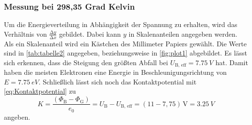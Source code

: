 \subsubsection*{Messung bei 298,35 Grad Kelvin}
Um die Energieverteilung in Abhängigkeit der Spannung zu erhalten, wird das Verhältnis von $\frac{\increment y}{\increment x}$ gebildet.
Dabei kann $y$ in Skalenanteilen angegeben werden.
Als ein Skalenanteil wird ein Kästchen des Millimeter Papiers gewählt.
Die Werte sind in \autoref{tab:tabelle2} angegeben, beziehungsweise in \autoref{fig:plot1} abgebildet.
Es lässt sich erkennen, dass die Steigung den größten Abfall bei $U_\text{B, eff} = \qty{7.75}{V}$ hat.
Damit haben die meisten Elektronen eine Energie in Beschleunigungsrichtung von $E = \qty{7.75}{eV}$.
Schließlich lässt sich noch das Kontaktpotential mit \autoref{eq:Kontaktpotential} zu
\begin{equation}
  K = \frac{\left( \Phi_\text{B} - \Phi_\text{G} \right)}{e_0} = U_\text{B} - U_\text{B, eff} = (11 - 7,75) \, \unit\V = \qty{3.25}{V}
\end{equation}
angeben.


